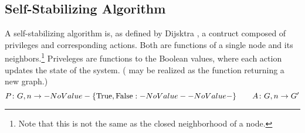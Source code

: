 \subsection{Self-Stabilizing Algorithm}
\label{sec:math-defin:self-stab-algor}

A self-stabilizing algorithm is, as defined by
  Dijsktra \autocite{Dijkstra:1974:SSS:361179.361202},
  a contruct composed of \glspl{privilege} and corresponding \glspl{action}.
Both are functions of a single node and its neighbors.\footnote{%
  Note that this is not the same as the closed neighborhood of a node.}
Priveleges are functions to the Boolean values,
  where each action updates the state of the system.
( may be realized as the function returning a new graph.)
\[
\Function[P]{G, n}{\SetBoolean}
\qquad
\Function[A]{G, n}{G^\prime}
\]

